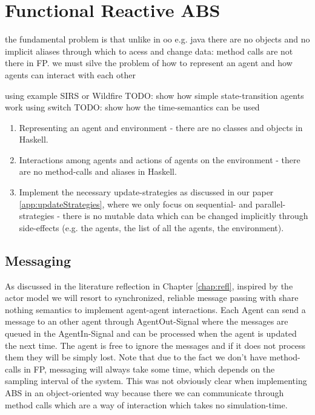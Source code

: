 \section{Functional Reactive ABS}
the fundamental problem is that unlike in oo e.g. java there are no objects and no implicit aliases through which to acess and change data: method calls are not there in FP. we must silve the problem of how to represent an agent and how agents can interact with each other

using example SIRS or Wildfire
TODO: show how simple state-transition agents work using switch
TODO: show how the time-semantics can be used

\begin{enumerate}
	\item Representing an agent and environment - there are no classes and objects in Haskell.
	\item Interactions among agents and actions of agents on the environment - there are no method-calls and aliases in Haskell.
	\item Implement the necessary update-strategies as discussed in our paper \ref{app:updateStrategies}, where we only focus on sequential- and parallel-strategies - there is no mutable data which can be changed implicitly through side-effects (e.g. the agents, the list of all the agents, the environment).
\end{enumerate}

\subsection{Messaging}
As discussed in the literature reflection in Chapter \ref{chap:refl}, inspired by the actor model we will resort to synchronized, reliable message passing with share nothing semantics to implement agent-agent interactions. Each Agent can send a message to an other agent through AgentOut-Signal where the messages are queued in the AgentIn-Signal and can be processed when the agent is updated the next time. The agent is free to ignore the messages and if it does not process them they will be simply lost.
Note that due to the fact we don't have method-calls in FP, messaging will always take some time, which depends on the sampling interval of the system. This was not obviously clear when implementing ABS in an object-oriented way because there we can communicate through method calls which are a way of interaction which takes no simulation-time.


